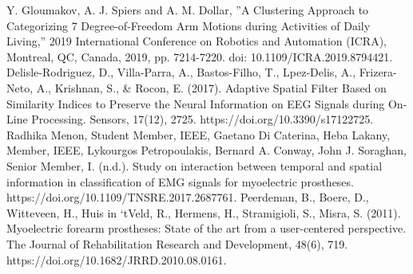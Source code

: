 \documentclass[letterpaper, 10 pt, conference]{ieeeconf}  %
\begin{document}
\begin{thebibliography}{99}
 Y. Gloumakov, A. J. Spiers and A. M. Dollar, ”A Clustering Approach to Categorizing 7 Degree-of-Freedom Arm Motions during Activities of Daily Living,” 2019 International Conference on Robotics and Automation (ICRA), Montreal, QC, Canada, 2019, pp. 7214-7220. doi: 10.1109/ICRA.2019.8794421.
 Delisle-Rodriguez, D., Villa-Parra, A., Bastos-Filho, T., Lpez-Delis, A., Frizera-Neto, A., Krishnan, S., \& Rocon, E. (2017). Adaptive Spatial Filter Based on Similarity Indices to Preserve the Neural Information on EEG Signals during On-Line Processing. Sensors, 17(12), 2725. https://doi.org/10.3390/s17122725.
 Radhika Menon, Student Member, IEEE, Gaetano Di Caterina, Heba Lakany, Member, IEEE, Lykourgos Petropoulakis, Bernard A. Conway, John J. Soraghan, Senior Member, I. (n.d.). Study on interaction between temporal and spatial information in classification of EMG signals for myoelectric prostheses. https://doi.org/10.1109/TNSRE.2017.2687761.
 Peerdeman, B., Boere, D., Witteveen, H., Huis in ‘tVeld, R., Hermens, H., Stramigioli, S., Misra, S. (2011). Myoelectric forearm prostheses: State of the art from a user-centered perspective. The Journal of Rehabilitation Research and Development, 48(6), 719. https://doi.org/10.1682/JRRD.2010.08.0161.

\end{thebibliography}
\end{document}
